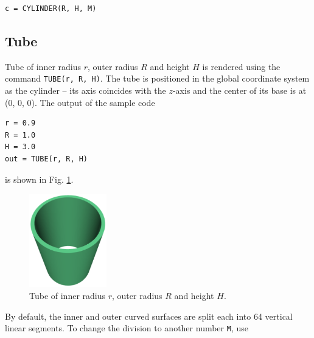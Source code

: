\begin{bbox}
\begin{verbatim}
c = CYLINDER(R, H, M)
\end{verbatim}
\end{bbox}
\vspace{6mm}

\noindent

\subsection{Tube}

Tube of inner radius $r$, outer radius $R$ and height
$H$ is rendered using the command {\tt TUBE(r, R, H)}. 
The tube is positioned in the global coordinate system 
as the cylinder -- its axis coincides with the $z$-axis and 
the center of its base is at (0, 0, 0). 
The output of the sample code\\

\begin{bbox}
\begin{verbatim}
r = 0.9
R = 1.0
H = 3.0
out = TUBE(r, R, H)
\end{verbatim}
\end{bbox}
\vspace{6mm}

\noindent
is shown in Fig. \ref{fig:tube-1}.

\begin{figure}[!ht]
\begin{center}
\includegraphics[width=0.3\textwidth]{img/tube-1.png}
\end{center}
\vspace{-4mm}
\caption{Tube of inner radius $r$, outer radius $R$ and height $H$.}
\label{fig:tube-1}
\end{figure}
\noindent
By default, the inner and outer curved surfaces are split each into 64 vertical 
linear segments. To change the division to another number {\tt M}, use\\

